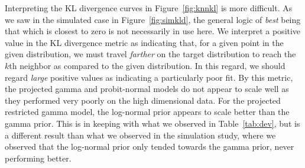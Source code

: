 Interpreting the KL divergence curves in Figure~\ref{fig:knnkl} is more difficult.  As we saw in
  the simulated case in Figure~\ref{fig:simkld}, the general logic of \emph{best} being that which
  is closest to zero is not necessarily in use here.  We interpret a positive value in the KL
  divergence metric as indicating that, for a given point in the given distribution, we must 
  travel \emph{farther} on the target distribution to reach the $k$th neighbor as compared to 
  the given distribution.  In this regard, we should regard \emph{large} positive values as
  indicating a particularly poor fit.  By this metric, the projected gamma and probit-normal 
  models do not appear to scale well as they performed very poorly on the high dimensional data.
  For the projected restricted gamma model, the log-normal prior appears to scale better than the
  gamma prior.  This is in keeping with what we observed in Table~\ref{tab:dev}, but is a 
  different result than what we observed in the simulation study, where we observed that the
  log-normal prior only tended towards the gamma prior, never performing better.

